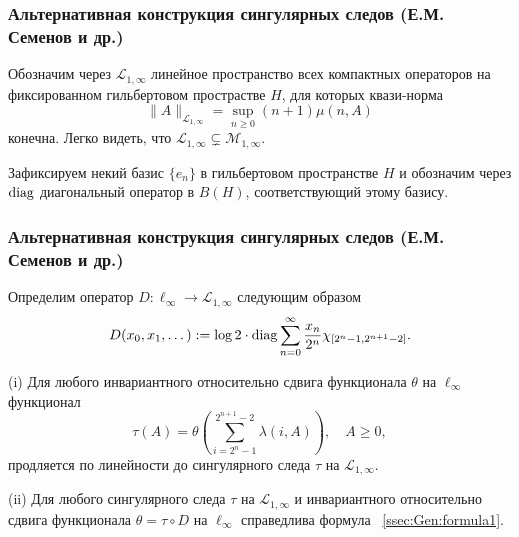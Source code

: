 \begin{frame}\frametitle{Альтернативная конструкция сингулярных следов (Е.М. Семенов и др.)}

	Обозначим через $\mathcal L_{1,\infty}$ линейное пространство всех компактных операторов на фиксированном гильбертовом прострастве $H$, для которых квази-норма
	$$\|A\|_{\mathcal L_{1,\infty}} = \sup_{n \ge 0} (n+1) \mu(n,A)$$
	конечна. Легко видеть, что $\mathcal L_{1,\infty} \subsetneq \mathcal M_{1,\infty}$.

	\vfill

	Зафиксируем некий базис $\{e_n\}$ в гильбертовом пространстве $H$ и обозначим через ${\rm diag}$ диагональный оператор в $B(H)$, соответствующий этому базису.

\end{frame}

\begin{frame}\frametitle{Альтернативная конструкция сингулярных следов (Е.М. Семенов и др.)}

	Определим оператор $D: \ell_\infty \to \mathcal L_{1,\infty}$ следующим образом
	\begin{align*}
	D(x_0, x_1, \dots) := \log 2 \cdot {\rm diag} \sum_{n=0}^\infty \frac{x_n}{2^n} \chi_{[2^n-1,2^{n+1}-2]}.
	\end{align*}

	\begin{ttheorem}
		(i) Для любого инвариантного относительно сдвига функционала $\theta$ на $\ell_\infty$ функционал
	\begin{equation}\label{ssec:Gen:formula1}
	\tau(A) = \theta\left(\sum_{i=2^n-1}^{2^{n+1}-2} \lambda(i,A) \right) , \quad A\ge0,
	\end{equation}
	продляется по линейности до сингулярного следа $\tau$ на $\mathcal L_{1,\infty}$.

	(ii) Для любого сингулярного следа $\tau$ на $\mathcal L_{1,\infty}$ и инвариантного относительно сдвига функционала $\theta=\tau\circ D$ на $\ell_\infty$ справедлива формула ~\eqref{ssec:Gen:formula1}.
	\end{ttheorem}

\end{frame}



